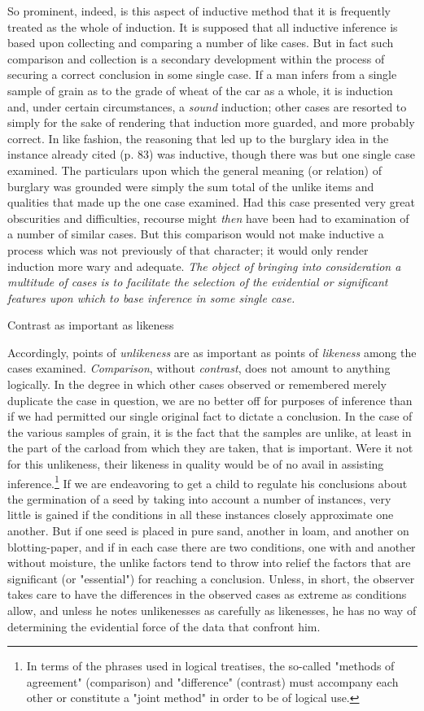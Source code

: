\documentclass[letterpaper]{book}
\begin{document}
So prominent, indeed, is this aspect of inductive method that it is
frequently treated as the whole of induction. It is supposed that all
inductive inference is based upon collecting and comparing a number of
like cases. But in fact such comparison and collection is
a
secondary development within the process of securing a correct
conclusion in some single case. If a man infers from a single sample of
grain as to the grade of wheat of the car as a whole, it is induction
and, under certain circumstances, a \emph{sound} induction; other cases
are resorted to simply for the sake of rendering that induction more
guarded, and more probably correct. In like fashion, the reasoning that
led up to the burglary idea in the instance already cited (p. 83) was
inductive, though there was but one single case examined. The
particulars upon which the general meaning (or relation) of burglary was
grounded were simply the sum total of the unlike items and qualities
that made up the one case examined. Had this case presented very great
obscurities and difficulties, recourse might \emph{then} have been had
to examination of a number of similar cases. But this comparison would
not make inductive a process which was not previously of that character;
it would only render induction more wary and adequate. \emph{The object
of bringing into consideration a multitude of cases is to facilitate the
selection of the evidential or significant features upon which to base
inference in some single case.}

Contrast as important as likeness

Accordingly, points of \emph{unlikeness} are as important as points of
\emph{likeness} among the cases examined. \emph{Comparison}, without
\emph{contrast}, does not amount to anything logically. In the degree in
which other cases observed or remembered merely duplicate the case in
question, we are no better off for purposes of inference than if we had
permitted our single original fact to dictate a conclusion. In the case
of the various samples of grain, it is the fact that the samples are
unlike, at least in the part of the carload from which they are taken,
that is important. Were it not for this unlikeness, their
likeness
in quality would be of no avail in assisting
inference.\footnote{
In terms of the phrases used in logical treatises, the so-called
"methods of agreement" (comparison) and "difference" (contrast) must
accompany each other or constitute a "joint method" in order to be of
logical use.
}
If we are endeavoring to get a child to regulate his conclusions about
the germination of a seed by taking into account a number of instances,
very little is gained if the conditions in all these instances closely
approximate one another. But if one seed is placed in pure sand, another
in loam, and another on blotting-paper, and if in each case there are
two conditions, one with and another without moisture, the unlike
factors tend to throw into relief the factors that are significant (or
"essential") for reaching a conclusion. Unless, in short, the observer
takes care to have the differences in the observed cases as extreme as
conditions allow, and unless he notes unlikenesses as carefully as
likenesses, he has no way of determining the evidential force of the
data that confront him.
\end{document}
